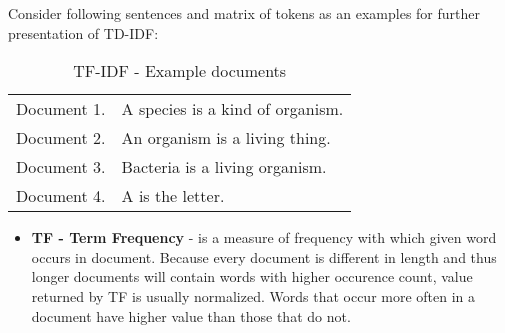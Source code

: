 Consider following sentences and matrix of tokens as an examples for further presentation of TD-IDF:

\begin{table}[ht]
	\centering
	\caption{TF-IDF - Example documents}
	\label{tf_idf_example_sentences}
	\begin{tabular}{@{}ll@{}}
		Document 1. & A species is a kind of organism. \\
		Document 2. & An organism is a living thing.   \\
		Document 3. & Bacteria is a living organism.   \\
		Document 4. & A is the letter.                
	\end{tabular}
\end{table}

\begin{itemize}
	\item \textbf{TF - Term Frequency} - is a measure of frequency with which given word occurs in document. Because every document is different in length and thus longer documents will contain words with higher occurence count, value returned by TF is usually normalized. Words that occur more often in a document have higher value than those that do not.
	

\end{itemize}
